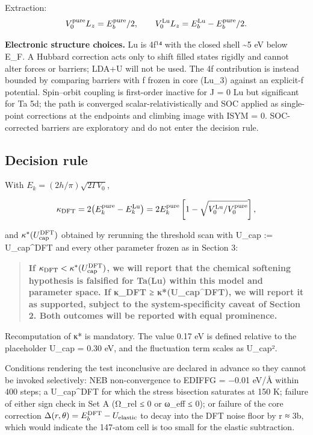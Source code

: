 Extraction: \[V_0^{\rm pure}L_z = E_b^{\rm pure}/2,\qquad V_0^{\rm Lu}L_z = E_b^{\rm Lu} - E_b^{\rm pure}/2.\]

\textbf{Electronic structure choices.} Lu is 4f¹⁴ with the closed shell \textasciitilde5 eV below E\_F. A Hubbard correction acts only to shift filled states rigidly and cannot alter forces or barriers; LDA+U will not be used. The 4f contribution is instead bounded by comparing barriers with f frozen in core (Lu\_3) against an explicit-f potential. Spin--orbit coupling is first-order inactive for J = 0 Lu but significant for Ta 5d; the path is converged scalar-relativistically and SOC applied as single-point corrections at the endpoints and climbing image with ISYM = 0. SOC-corrected barriers are exploratory and do not enter the decision rule.

\hypertarget{decision-rule}{%
\subsection{Decision rule}\label{sec:decision-rule}}

With \(E_k = (2h/\pi)\sqrt{2\Gamma V_0}\),

\[\kappa_{\rm DFT} = 2\bigl(E_k^{\rm pure} - E_k^{\rm Lu}\bigr) = 2E_k^{\rm pure}\left[1 - \sqrt{V_0^{\rm Lu}/V_0^{\rm pure}}\right],\]

and \(\kappa^*(U_{\rm cap}^{\rm DFT})\) obtained by rerunning the threshold scan with U\_cap := U\_cap\^{}DFT and every other parameter frozen as in Section 3:

\begin{quote}
\textbf{If \(\kappa_{\rm DFT} < \kappa^*(U_{\rm cap}^{\rm DFT})\), we will report that the chemical softening hypothesis is falsified for Ta(Lu) within this model and parameter space. If κ\_DFT ≥ κ*(U\_cap\^{}DFT), we will report it as supported, subject to the system-specificity caveat of Section 2. Both outcomes will be reported with equal prominence.}
\end{quote}

Recomputation of κ* is mandatory. The value 0.17 eV is defined relative to the placeholder U\_cap = 0.30 eV, and the fluctuation term scales as U\_cap².

Conditions rendering the test inconclusive are declared in advance so they cannot be invoked selectively: NEB non-convergence to EDIFFG = −0.01 eV/Å within 400 steps; a U\_cap\^{}DFT for which the stress bisection saturates at 150 K; failure of either sign check in Set A (Ω\_rel ≤ 0 or ω\_eff ≤ 0); or failure of the core correction \(\Delta(r,\theta) = E_b^{\rm DFT} - U_{\rm elastic}\) to decay into the DFT noise floor by r ≈ 3b, which would indicate the 147-atom cell is too small for the elastic subtraction.

